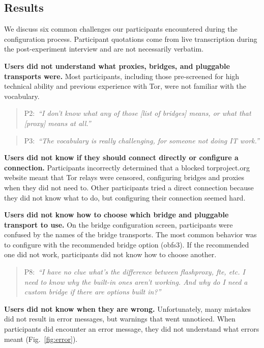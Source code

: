 \documentclass[USenglish,oneside,twocolumn]{article}
\newcommand{\pquote}[2]{
\begin{quotation}
\noindent #1:~\textit{``#2''}
\end{quotation}
}
\begin{document}
\subsection{Results} 
{\color {red}
We discuss six common challenges our participants encountered during the configuration process.
Participant quotations come from live transcription during the post-experiment interview
and are not necessarily verbatim.\\

\begin{description}
\item {\bfseries Users did not understand what proxies, bridges, and pluggable transports were.}
Most participants, including those pre-screened for high technical ability and previous experience with Tor, were not familiar with the vocabulary.

\smallskip
\pquote{P2}{I don't know what any of those [list of bridges] means, or what that [proxy] means at all.}
\smallskip
\pquote{P3}{The vocabulary is really challenging, for someone not doing IT work.}
\smallskip

\item {\bfseries Users did not know if they should connect directly or configure a connection.}
Participants incorrectly determined that a blocked torproject.org website meant that Tor relays were censored, configuring bridges and proxies when they did not need to. Other participants tried a direct connection because they did not know what to do, but configuring their connection seemed hard. 

\item {\bfseries Users did not know how to choose which bridge and pluggable transport to use.}
On the bridge configuration screen, participants were confused by the names of the bridge transports. The most common behavior was to configure with the recommended bridge option (obfs3). If the recommended one did not work, participants did not know how to choose another. 

\smallskip
\pquote{P8}{I have no clue what's the difference between flashproxy, fte, etc. I need to know why the built-in ones aren't working. And why do I need a custom bridge if there are options built in?}
\smallskip

\item {\bfseries Users did not know when they are wrong.}
Unfortunately, many mistakes did not result in error messages, but warnings that went unnoticed.
When participants did encounter an error message, they did not understand what errors meant (Fig.~\ref{fig:error}).


\end{description}}
\end{document}
